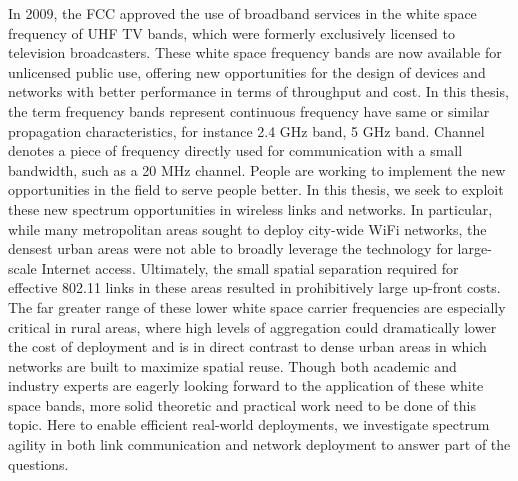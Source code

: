In 2009, the FCC approved the use of broadband services in the white space frequency 
of UHF TV bands, which were formerly exclusively licensed to television broadcasters. 
These white space frequency bands are now available for unlicensed public use, offering 
new opportunities for the design of devices and networks with better performance in 
terms of throughput and cost. In this thesis, the term frequency bands represent 
continuous frequency have same or similar propagation characteristics, for instance 
2.4 GHz band, 5 GHz band. Channel denotes a piece of frequency directly used for 
communication with a small bandwidth, such as a 20 MHz channel. People are working 
to implement the new opportunities in the field to serve people better. In this thesis, 
we seek to exploit these new spectrum opportunities in wireless links and networks. 
In particular, while many metropolitan areas sought to deploy city-wide WiFi networks, 
the densest urban areas were not able to broadly leverage the technology for large-scale 
Internet access.  Ultimately, the small spatial separation required for effective 802.11 
links in these areas resulted in prohibitively large up-front costs. The far greater 
range of these lower white space carrier frequencies are especially critical in rural 
areas, where high levels of aggregation could dramatically lower the cost of deployment 
and is in direct contrast to dense urban areas in which networks are built to maximize 
spatial reuse. Though both academic and industry experts are eagerly looking forward to 
the application of these white space bands, more solid theoretic and practical work need 
to be done of this topic. Here to enable efficient real-world deployments, we investigate 
spectrum agility in both link communication and network deployment to answer part of the 
questions. 

